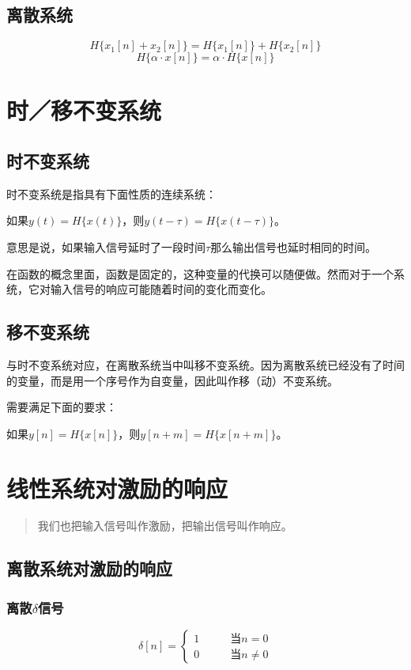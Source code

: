 \subsection{离散系统}
\begin{equation}
	H\{x_1[n]+x_2[n]\}=H\{x_1[n]\}+H\{x_2[n]\}
\end{equation}
\begin{equation}
	H\{\alpha\cdot x[n]\}=\alpha\cdot H\{x[n]\}
\end{equation}
\section{时／移不变系统}
\subsection{时不变系统}
时不变系统是指具有下面性质的连续系统：

如果$y(t)=H\{x(t)\}$，则$y(t-\tau)=H\{x(t-\tau)\}$。

意思是说，如果输入信号延时了一段时间$\tau$那么输出信号也延时相同的时间。

在函数的概念里面，函数是固定的，这种变量的代换可以随便做。然而对于一个系统，它对输入信号的响应可能随着时间的变化而变化。
\subsection{移不变系统}
与时不变系统对应，在离散系统当中叫移不变系统。因为离散系统已经没有了时间的变量，而是用一个序号作为自变量，因此叫作移（动）不变系统。

需要满足下面的要求：

如果$y[n]=H\{x[n]\}$，则$y[n+m]=H\{x[n+m]\}$。

\section{线性系统对激励的响应}
\begin{quote}
	我们也把输入信号叫作激励，把输出信号叫作响应。
\end{quote}
\subsection{离散系统对激励的响应}
\subsubsection{离散$\delta$信号}
\begin{equation}
	\delta[n]=
	\left\{
	\begin{aligned}
		1  \qquad & 当n=0     \\
		0  \qquad & 当n\neq 0
	\end{aligned}
	\right.
\end{equation}

